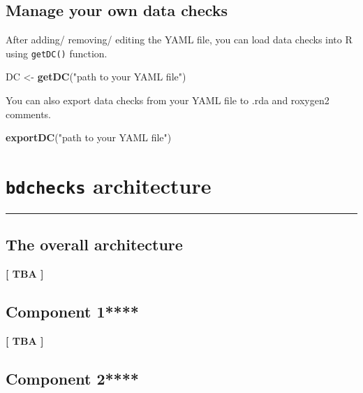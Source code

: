 \documentclass[]{book}
\newenvironment{Shaded}{\begin{snugshade}}{\end{snugshade}}
\newcommand{\KeywordTok}[1]{\textcolor[rgb]{0.13,0.29,0.53}{\textbf{#1}}}
\newcommand{\StringTok}[1]{\textcolor[rgb]{0.31,0.60,0.02}{#1}}
\newcommand{\NormalTok}[1]{#1}
\theoremstyle{definition}
\theoremstyle{definition}
\theoremstyle{definition}
\theoremstyle{remark}
\begin{document}
\section{Manage your own data checks}\label{manage-your-own-data-checks}

After adding/ removing/ editing the YAML file, you can load data checks
into R using \texttt{getDC()} function.

\begin{Shaded}
\begin{Highlighting}[]
\NormalTok{DC <-}\StringTok{ }\KeywordTok{getDC}\NormalTok{(}\StringTok{"path to your YAML file"}\NormalTok{)}
\end{Highlighting}
\end{Shaded}

You can also export data checks from your YAML file to .rda and roxygen2
comments.

\begin{Shaded}
\begin{Highlighting}[]
\KeywordTok{exportDC}\NormalTok{(}\StringTok{"path to your YAML file"}\NormalTok{)}
\end{Highlighting}
\end{Shaded}

\chapter{\texorpdfstring{\texttt{bdchecks}
architecture}{bdchecks architecture}}\label{bdchecks-architecture}

\begin{center}\rule{0.5\linewidth}{\linethickness}\end{center}

\section{The overall architecture}\label{the-overall-architecture}

\textbf{{{[} TBA {]}}}

\section{Component 1****}\label{component-1}

\textbf{{{[} TBA {]}}}

\section{Component 2****}\label{component-2}
\end{document}
